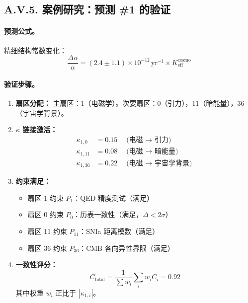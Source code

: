 \documentclass[11pt,a4paper]{article}
\begin{document}
	\subsection*{A.V.5. 案例研究：预测 \#1 的验证}
	
	\paragraph{预测公式。}
	精细结构常数变化：
	\[
	\frac{\Delta\alpha}{\alpha} = (2.4 \pm 1.1) \times 10^{-12}\,\text{yr}^{-1} \times K_{\mathrm{eff}}^{\mathrm{cosmo}}
	\]
	
	\paragraph{验证步骤。}
	
	\begin{enumerate}[leftmargin=*]
		\item \textbf{扇区分配：} 主扇区：1（电磁学）。次要扇区：0（引力），11（暗能量），36（宇宙学背景）。
		
		\item \textbf{$\kappa$ 链接激活：}
		\begin{align*}
			\kappa_{1,0} &= 0.15 \quad \text{(电磁 $\to$ 引力)} \\
			\kappa_{1,11} &= 0.08 \quad \text{(电磁 $\to$ 暗能量)} \\
			\kappa_{1,36} &= 0.22 \quad \text{(电磁 $\to$ 宇宙学背景)}
		\end{align*}
		
		\item \textbf{约束满足：}
		\begin{itemize}
			\item 扇区 1 约束 $P_1$：QED 精度测试（满足）
			\item 扇区 0 约束 $P_0$：历表一致性（满足，$\Delta < 2\sigma$）
			\item 扇区 11 约束 $P_{11}$：SNIa 距离模数（满足）
			\item 扇区 36 约束 $P_{36}$：CMB 各向异性界限（满足）
		\end{itemize}
		
		\item \textbf{一致性评分：}
		\[
		C_{\text{total}} = \frac{1}{\sum w_i}\sum_i w_i C_i = 0.92
		\]
		其中权重 $w_i$ 正比于 $|\kappa_{1,i}|$。
	\end{enumerate}
	
\end{document}
